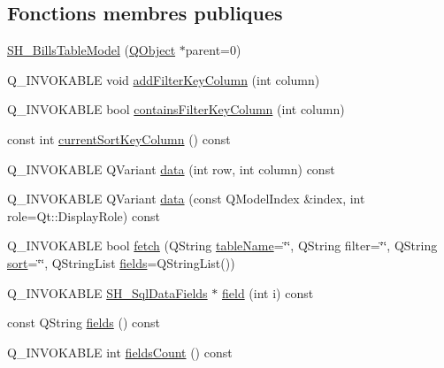 \subsection*{Fonctions membres publiques}
\begin{DoxyCompactItemize}
\item 
\hyperlink{classSH__BillsTableModel_ab93c4113bb4f81833f9a3b7d9365ed3f}{S\-H\-\_\-\-Bills\-Table\-Model} (\hyperlink{classQObject}{Q\-Object} $\ast$parent=0)
\item 
Q\-\_\-\-I\-N\-V\-O\-K\-A\-B\-L\-E void \hyperlink{classSH__ExtendedProxyModel_a7b432fac5c42bf84a005f2942896ca32}{add\-Filter\-Key\-Column} (int column)
\item 
Q\-\_\-\-I\-N\-V\-O\-K\-A\-B\-L\-E bool \hyperlink{classSH__ExtendedProxyModel_a81c40d3ce9710029cae19cc65bf5419d}{contains\-Filter\-Key\-Column} (int column)
\item 
const int \hyperlink{classSH__ExtendedProxyModel_adbbc1e62c72991f4ed14537cf1ba9c8f}{current\-Sort\-Key\-Column} () const 
\item 
Q\-\_\-\-I\-N\-V\-O\-K\-A\-B\-L\-E Q\-Variant \hyperlink{classSH__ExtendedProxyModel_aca6cc510f740e847e0cfc06e0adb5771}{data} (int row, int column) const 
\item 
Q\-\_\-\-I\-N\-V\-O\-K\-A\-B\-L\-E Q\-Variant \hyperlink{classSH__ExtendedProxyModel_afbc947efbe1107fc5bf8926c52902a1c}{data} (const Q\-Model\-Index \&index, int role=Qt\-::\-Display\-Role) const 
\item 
Q\-\_\-\-I\-N\-V\-O\-K\-A\-B\-L\-E bool \hyperlink{classSH__ExtendedProxyModel_a1df5323af8d29e81f22a7118227eeeb8}{fetch} (Q\-String \hyperlink{classSH__ExtendedProxyModel_abb133e196ca7cf90b9c9b57263e898d6}{table\-Name}=\char`\"{}\char`\"{}, Q\-String filter=\char`\"{}\char`\"{}, Q\-String \hyperlink{classSH__ExtendedProxyModel_a2d5fdb58bf67879e3f3130619b93104a}{sort}=\char`\"{}\char`\"{}, Q\-String\-List \hyperlink{classSH__ExtendedProxyModel_a3a69386b6070dacf320ef29e760816c1}{fields}=Q\-String\-List())
\item 
Q\-\_\-\-I\-N\-V\-O\-K\-A\-B\-L\-E \hyperlink{classSH__SqlDataFields}{S\-H\-\_\-\-Sql\-Data\-Fields} $\ast$ \hyperlink{classSH__ExtendedProxyModel_a75081819198741a532eefd5875a90678}{field} (int i) const 
\item 
const Q\-String \hyperlink{classSH__ExtendedProxyModel_a3a69386b6070dacf320ef29e760816c1}{fields} () const 
\item 
Q\-\_\-\-I\-N\-V\-O\-K\-A\-B\-L\-E int \hyperlink{classSH__ExtendedProxyModel_ab935cb0865fd2010ab35f1743adb8633}{fields\-Count} () const 

\end{DoxyCompactItemize}
